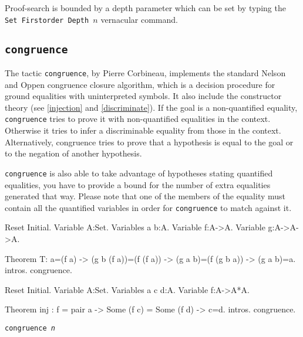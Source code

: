 \begin{coq_example*}
Proof-search is bounded by a depth parameter which can be set by typing the
{\nobreak \tt Set Firstorder Depth $n$} 
vernacular command.


\subsection{\tt congruence}
\label{congruence}

The tactic {\tt congruence}, by Pierre Corbineau, implements the standard Nelson and Oppen
congruence closure algorithm, which is a decision procedure for ground
equalities with uninterpreted symbols. It also include the constructor theory
(see \ref{injection} and \ref{discriminate}).
If the goal is a non-quantified equality, {\tt congruence} tries to
prove it with non-quantified equalities in the context. Otherwise it
tries to infer a discriminable equality from those in the context. Alternatively, congruence tries to prove that a hypothesis is equal to the goal or to the negation of another hypothesis.

{\tt congruence} is also able to take advantage of hypotheses stating quantified equalities, you have to provide a bound for the number of extra equalities generated that way. Please note that one of the members of the equality must contain all the quantified variables in order for {\tt congruence} to match against it.

\begin{coq_eval}
Reset Initial.
Variable A:Set.
Variables a b:A.
Variable f:A->A.
Variable g:A->A->A.
\end{coq_eval}

\begin{coq_example}
Theorem T:
  a=(f a) -> (g b (f a))=(f (f a)) -> (g a b)=(f (g b a)) -> (g a b)=a.
intros.
congruence.
\end{coq_example}

\begin{coq_eval}
Reset Initial.
Variable A:Set.
Variables a c d:A.
Variable f:A->A*A.
\end{coq_eval}

\begin{coq_example}
Theorem inj : f = pair a -> Some (f c) = Some (f d) -> c=d.
intros.
congruence.
\end{coq_example}

\begin{Variants}
 \item {\tt congruence {\sl n}}


\end{Variants}
\end{coq_example*}

